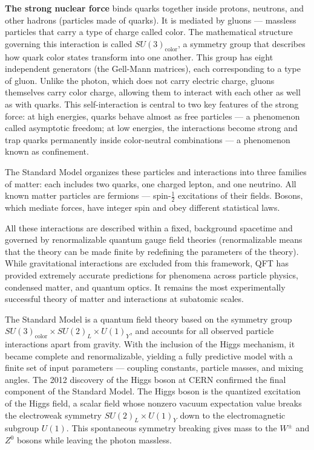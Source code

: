 \textbf{The strong nuclear force} binds quarks together inside protons, neutrons, and other hadrons (particles made of quarks). It is mediated by gluons — massless particles that carry a type of charge called color. The mathematical structure governing this interaction is called \(SU(3)_\text{color}\), a symmetry group that describes how quark color states transform into one another. This group has eight independent generators (the Gell-Mann matrices), each corresponding to a type of gluon. Unlike the photon, which does not carry electric charge, gluons themselves carry color charge, allowing them to interact with each other as well as with quarks. This self-interaction is central to two key features of the strong force: at high energies, quarks behave almost as free particles — a phenomenon called asymptotic freedom; at low energies, the interactions become strong and trap quarks permanently inside color-neutral combinations — a phenomenon known as confinement.

The Standard Model organizes these particles and interactions into three families of matter: each includes two quarks, one charged lepton, and one neutrino. All known matter particles are fermions — spin-$\frac{1}{2}$ excitations of their fields. Bosons, which mediate forces, have integer spin and obey different statistical laws.

All these interactions are described within a fixed, background spacetime and governed by renormalizable quantum gauge field theories (renormalizable means that the theory can be made finite by redefining the parameters of the theory). While gravitational interactions are excluded from this framework, QFT has provided extremely accurate predictions for phenomena across particle physics, condensed matter, and quantum optics. It remains the most experimentally successful theory of matter and interactions at subatomic scales.

The Standard Model is a quantum field theory based on the symmetry group $SU(3)_\text{color} \times SU(2)_L \times U(1)_Y$, and accounts for all observed particle interactions apart from gravity. With the inclusion of the Higgs mechanism, it became complete and renormalizable, yielding a fully predictive model with a finite set of input parameters — coupling constants, particle masses, and mixing angles. The 2012 discovery of the Higgs boson at CERN confirmed the final component of the Standard Model. The Higgs boson is the quantized excitation of the Higgs field, a scalar field whose nonzero vacuum expectation value breaks the electroweak symmetry \(SU(2)_L\times U(1)_Y\) down to the electromagnetic subgroup \(U(1)\). This spontaneous symmetry breaking gives mass to the \(W^\pm\) and \(Z^0\) bosons while leaving the photon massless.

